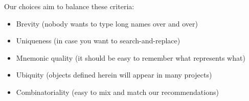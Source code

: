 Our choices aim to balance these criteria:
\begin{itemize}
\item Brevity (nobody wants to type long names over and over)
\item Uniqueness (in case you want to search-and-replace)
\item Mnemonic quality (it should be easy to remember what represents what)
\item Ubiquity (objects defined herein will appear in many projects)
\item Combinatoriality (easy to mix and match our recommendations)
\end{itemize}

